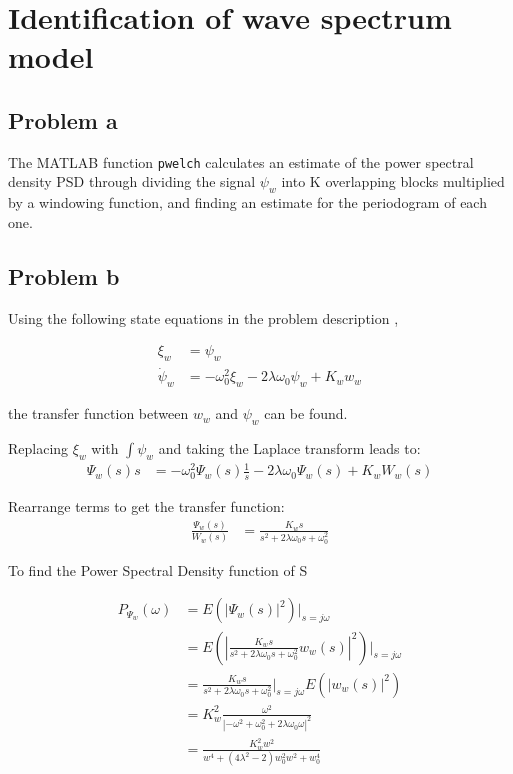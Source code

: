 \section{Identification of wave spectrum model}
\subsection{Problem a}
The MATLAB function \texttt{pwelch} calculates an estimate of the power spectral density PSD through
dividing the signal $\psi_w$ into K overlapping blocks multiplied by a windowing function, and finding an
estimate for the periodogram of each one.

\subsection{Problem b}
Using the following state equations in the problem description ,

\begin{align*}
    \xi_w &= \psi_w \\
    \dot{\psi}_w &= -\omega^2_0\xi_w - 2\lambda\omega_0\psi_w + K_ww_w
\end{align*}

the transfer function between $w_w$ and $\psi_w$ can be found.

Replacing $\xi_w$ with $\int\psi_w$ and taking the Laplace transform leads to:
\begin{align*}
    \Psi_w(s)s &= -\omega^2_0\Psi_w(s)\frac{1}{s} - 2\lambda\omega_0\Psi_w(s) + K_wW_w(s)
\end{align*}

Rearrange terms to get the transfer function:
\begin{align*}
    \frac{\Psi_w(s)}{W_w(s)} &= \frac{K_ws}{s^2 + 2\lambda\omega_0s + \omega^2_0}
\end{align*}

To find the Power Spectral Density function of S

\begin{align*}
    P_{\Psi_w}(\omega) &= E(\left|\Psi_w(s)\right|^2)|_{s=j\omega} \\
    &= E\left(\left|\frac{K_ws}{s^2 + 2\lambda\omega_0s + \omega^2_0}w_w(s)\right|^2\right)|_{s=j\omega} \\
    &= \frac{K_ws}{s^2 + 2\lambda\omega_0s + \omega^2_0}|_{s=j\omega} E(\left|w_w(s)\right|^2) \\
    &= K_w^2\frac{\omega^2}{\left|-\omega^2+\omega^2_0+2\lambda\omega_0\omega\right|^2} \\
    &= \frac{K_w^2w^2}{w^4+(4\lambda^2-2)w_0^2w^2+w_0^4}
\end{align*}

